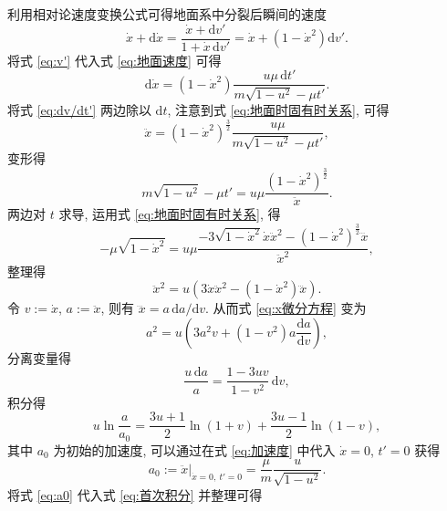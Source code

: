 \documentclass{article}
\begin{document}
利用相对论速度变换公式可得地面系中分裂后瞬间的速度
\begin{equation}
	\label{eq:地面速度}
	\dot x+\mathrm d\dot x=\frac{\dot x+\mathrm dv'}{1+\dot x\,\mathrm dv'}
	=\dot x+\left(1-\dot x^2\right)\mathrm dv'.
\end{equation}
将式 \ref{eq:v'} 代入式 \ref{eq:地面速度} 可得
\begin{equation}
	\label{eq:dv/dt'}
	\mathrm d\dot x=\left(1-\dot x^2\right)\frac{u\mu\,\mathrm dt'}{m\sqrt{1-u^2}-\mu t'}.
\end{equation}
将式 \ref{eq:dv/dt'} 两边除以 $\mathrm dt$, 注意到式 \ref{eq:地面时固有时关系}, 可得
\begin{equation}
	\label{eq:加速度}
	\ddot x=\left(1-\dot x^2\right)^{\frac32}\frac{u\mu}{m\sqrt{1-u^2}-\mu t'},
\end{equation}
变形得
\begin{equation}
	m\sqrt{1-u^2}-\mu t'=u\mu\frac{\left(1-\dot x^2\right)^{\frac32}}{\ddot x}.
\end{equation}
两边对 $t$ 求导, 运用式 \ref{eq:地面时固有时关系}, 得
\begin{equation}
	-\mu\sqrt{1-\dot x^2}=u\mu
	\frac{-3\sqrt{1-\dot x^2}\dot x\ddot x^2-\left(1-\dot x^2\right)^{\frac32}\dddot x}{\ddot x^2},
\end{equation}
整理得
\begin{equation}
	\label{eq:x微分方程}
	\ddot x^2=u\left(3\dot x\ddot x^2-\left(1-\dot x^2\right)\dddot x\right).
\end{equation}
令 $v:=\dot x$, $a:=\ddot x$, 则有 $\dddot x=a\,\mathrm da/\mathrm dv$.
从而式 \ref{eq:x微分方程} 变为
\begin{equation}
	a^2=u\left(3a^2v+\left(1-v^2\right)a\frac{\mathrm da}{\mathrm dv}\right),
\end{equation}
分离变量得
\begin{equation}
	\frac{u\,\mathrm da}{a}=\frac{1-3uv}{1-v^2}\,\mathrm dv,
\end{equation}
积分得
\begin{equation}
	\label{eq:首次积分}
	u\ln\frac a{a_0}=\frac{3u+1}2\ln\!\left(1+v\right)+\frac{3u-1}2\ln\!\left(1-v\right),
\end{equation}
其中 $a_0$ 为初始的加速度, 可以通过在式 \ref{eq:加速度} 中代入 $\dot x=0$, $t'=0$ 获得
\begin{equation}
	\label{eq:a0}
	a_0:=\left.\ddot x\right|_{\dot x=0,~t'=0}=\frac\mu m\frac u{\sqrt{1-u^2}}.
\end{equation}
将式 \ref{eq:a0} 代入式 \ref{eq:首次积分} 并整理可得
\end{document}
